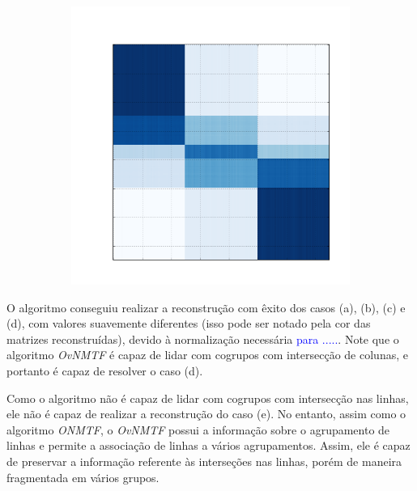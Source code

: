 \documentclass[
    12pt,                %
    oneside,            %
    a4paper,            %
    english,            %
    brazil                %
    ]{abntex2ppgsi}
\begin{document}
\begin{figure}[H]
\begin{subfigure}[b]{0.18\textwidth}
        \caption{}
    \end{subfigure}
    \begin{subfigure}[b]{0.18\textwidth}
        \includegraphics[width=\textwidth]{img/e-reconstruction-ovnmtf.png}
        \caption{}
    \end{subfigure}
    \label{fig:reconstruction:ovnmtf}
\end{figure}

O algoritmo conseguiu realizar a reconstrução com êxito dos casos (a), (b), (c) e (d), com valores suavemente diferentes (isso pode ser notado pela cor das matrizes reconstruídas), devido à normalização necessária \textcolor{blue}{para .....}. Note que o algoritmo \textit{OvNMTF} é capaz de lidar com cogrupos com intersecção de colunas, e portanto é capaz de resolver o caso (d). 

Como o algoritmo não é capaz de lidar com cogrupos com intersecção nas linhas, ele não é capaz de realizar a reconstrução do caso (e). No entanto, assim como o algoritmo \textit{ONMTF}, o \textit{OvNMTF} possui a informação sobre o agrupamento de linhas e permite a associação de linhas a vários agrupamentos. Assim, ele é capaz de preservar a informação referente às interseções nas linhas, porém de maneira fragmentada em vários grupos.
\end{document}

